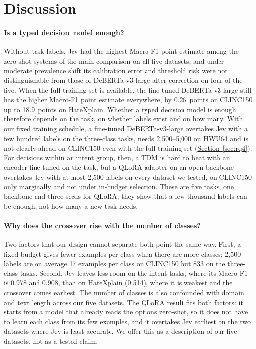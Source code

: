 \section{Discussion}
\label{sec:discussion}

\paragraph{Is a typed decision model enough?}
Without task labels, Jev had the highest Macro-F1 point estimate among the zero-shot systems of the main comparison on
all five datasets, and
under moderate prevalence shift its calibration error and threshold risk were not distinguishable from those of
DeBERTa-v3-large after correction on four of the five. When the full training set is available, the fine-tuned
DeBERTa-v3-large still has the higher Macro-F1 point estimate everywhere, by 0.26~points on CLINC150 up to 18.9~points on
HateXplain. Whether a typed decision model is enough therefore depends on the task, on whether labels exist and on how
many. With our fixed training schedule, a fine-tuned DeBERTa-v3-large overtakes Jev with a few hundred labels on the
three-class tasks, needs 2{,}500--5{,}000 on HWU64 and is not clearly ahead on CLINC150 even with the full training set
(\hyperref[sec:rq4]{Section~\ref*{sec:rq4}}). For decisions within an intent group, then, a TDM is hard to beat with an
encoder fine-tuned on the task, but a QLoRA adapter on an open backbone overtakes Jev with at most 2{,}500 labels on
every dataset we tested, on CLINC150 only marginally and not under in-budget selection. These are five tasks, one backbone and three seeds for QLoRA; they show that a few thousand
labels can be enough, not how many a new task needs.

\paragraph{Why does the crossover rise with the number of classes?}
Two factors that our design cannot separate both point the same way. First, a fixed budget gives fewer examples per
class when there are more classes: 2{,}500 labels are on average 17 examples per class on CLINC150 but 833 on the
three-class tasks. Second, Jev leaves less room on the intent tasks, where its Macro-F1 is 0.978 and 0.908, than on
HateXplain (0.514), where it is weakest and the crossover comes earliest. The number of classes is also confounded with
domain and text length across our five datasets. The QLoRA result fits both factors: it starts from a model that
already reads the options zero-shot, so it does not have to learn each class from its few examples, and it overtakes
Jev earliest on the two datasets where Jev is least accurate. We offer this as a description of our five datasets, not
as a tested claim.

